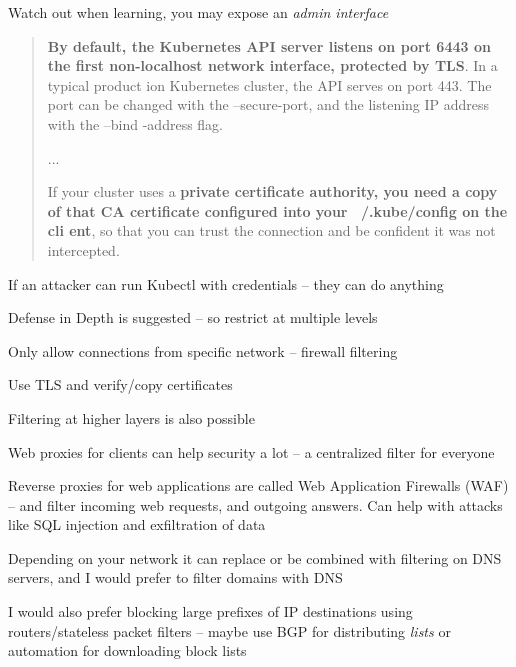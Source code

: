 \documentclass[Screen16to9,17pt]{foils}
\begin{document}


Watch out when learning, you may expose an \emph{admin interface}
\begin{quote}{\bf
By default, the Kubernetes API server listens on port 6443 on the first non-localhost network interface, protected by TLS}. In a typical product
ion Kubernetes cluster, the API serves on port 443. The port can be changed with the --secure-port, and the listening IP address with the --bind
-address flag.

...

If your cluster uses a {\bf private certificate authority, you need a copy of that CA certificate configured into your ~/.kube/config on the cli
ent}, so that you can trust the connection and be confident it was not intercepted.
\end{quote}

\begin{list2}
\item If an attacker can run Kubectl with credentials -- they can do anything
\item Defense in Depth is suggested -- so restrict at multiple levels
\item Only allow connections from specific network -- firewall filtering
\item Use TLS and verify/copy certificates
\end{list2}




Filtering at higher layers is also possible
\begin{list2}
\item Web proxies for clients can help security a lot -- a centralized filter for everyone

\item Reverse proxies for web applications are called
Web Application Firewalls (WAF) -- and filter incoming web requests, and outgoing answers. Can help with attacks like SQL injection and exfiltration of data
\item Depending on your network it can replace or be combined with filtering on DNS servers, and I would prefer to filter domains with DNS
\item I would also prefer blocking large prefixes of IP destinations using routers/stateless packet filters -- maybe use BGP for distributing \emph{lists} or automation for downloading block lists
\end{list2}
\end{document}
